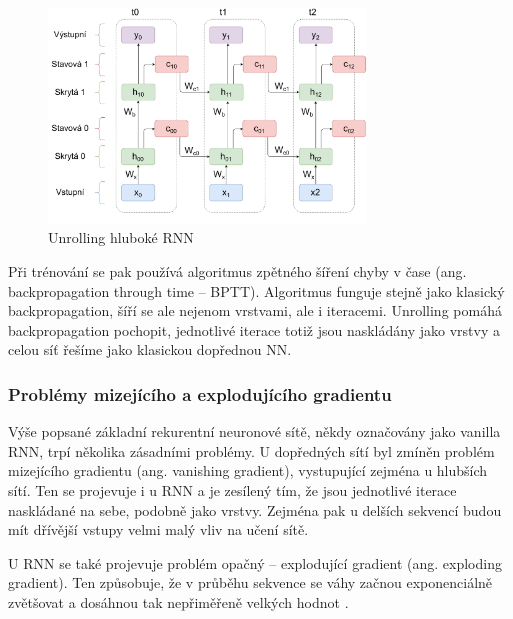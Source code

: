 \begin{figure}[]
    \centering
    \includegraphics[width=0.75\textwidth]{Figures/BPTT.pdf}
    \caption{Unrolling hluboké RNN}
    \label{fig:bptt}
\end{figure}

Při trénování se pak používá algoritmus zpětného šíření chyby v čase (ang.
backpropagation through time – BPTT). Algoritmus funguje stejně jako klasický
backpropagation, šíří se ale nejenom vrstvami, ale i iteracemi. Unrolling
pomáhá backpropagation pochopit, jednotlivé iterace totiž jsou naskládány jako
vrstvy a celou síť řešíme jako klasickou dopřednou NN.

\subsubsection*{Problémy mizejícího a explodujícího gradientu}

Výše popsané základní rekurentní neuronové sítě, někdy označovány jako vanilla
RNN, trpí několika zásadními problémy. U dopředných sítí byl zmíněn problém
mizejícího gradientu (ang. vanishing gradient), vystupující zejména u hlubších
sítí. Ten se projevuje i u RNN a je zesílený tím, že jsou jednotlivé iterace
naskládané na sebe, podobně jako vrstvy. Zejména pak u delších sekvencí budou
mít dřívější vstupy velmi malý vliv na učení sítě.

U RNN se také projevuje problém opačný – explodující gradient (ang. exploding
gradient). Ten způsobuje, že v průběhu sekvence se váhy začnou exponenciálně
zvětšovat a dosáhnou tak nepřiměřeně velkých hodnot \cite{rnn}.

